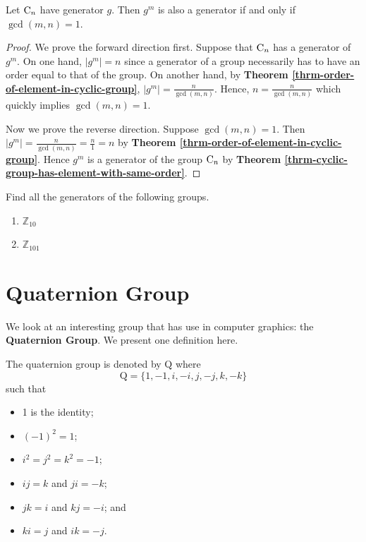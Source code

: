 \begin{corollary-thrm}
    Let $\mathrm{C}_{n}$ have generator $g$. Then $g^m$ is also a generator if and only if $\gcd(m, n) = 1$.
\end{corollary-thrm}
\begin{proof}
    We prove the forward direction first. Suppose that $\mathrm{C}_{n}$ has a generator of $g^m$. On one hand, $|g^m| = n$ since a generator of a group necessarily has to have an order equal to that of the group. On another hand, by \textbf{Theorem \ref{thrm-order-of-element-in-cyclic-group}}, $|g^m| = \frac{n}{\gcd(m, n)}$. Hence, $n = \frac{n}{\gcd(m, n)}$ which quickly implies $\gcd(m, n) = 1$.

    Now we prove the reverse direction. Suppose $\gcd(m,n) = 1$. Then $|g^m| = \frac{n}{\gcd(m,n)} = \frac{n}{1} = n$ by \textbf{Theorem \ref{thrm-order-of-element-in-cyclic-group}}. Hence $g^m$ is a generator of the group $\mathrm{C}_{n}$ by \textbf{Theorem \ref{thrm-cyclic-group-has-element-with-same-order}}.
\end{proof}

\begin{exercise}
    Find all the generators of the following groups.
    \begin{enumerate}[label=(\alph*)]
        \item $\mathbb{Z}_{10}$
        \item $\mathbb{Z}_{101}$
    \end{enumerate}
\end{exercise}

\section{Quaternion Group}
We look at an interesting group that has use in computer graphics: the \textbf{Quaternion Group}. We present one definition here.
\begin{definition}
    The quaternion group is denoted by $\mathrm{Q}$ where
    \[
            \mathrm{Q} = \{1, -1, i, -i, j, -j, k, -k\}
    \]
    such that
    \begin{itemize}
        \item 1 is the identity;
        \item $(-1)^2 = 1$;
        \item $i^2 = j^2 = k^2 = -1$;
        \item $ij = k$ and $ji = -k$;
        \item $jk = i$ and $kj = -i$; and
        \item $ki = j$ and $ik = -j$.
    \end{itemize}
\end{definition}

